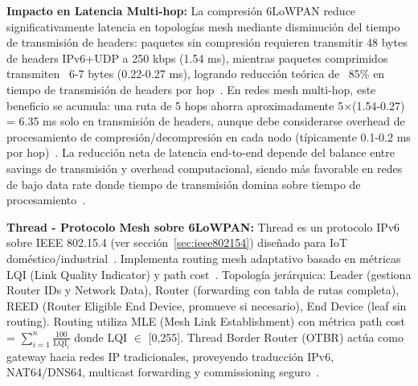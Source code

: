 \textbf{Impacto en Latencia Multi-hop:} La compresión 6LoWPAN reduce significativamente latencia en topologías mesh mediante disminución del tiempo de transmisión de headers: paquetes sin compresión requieren transmitir 48 bytes de headers IPv6+UDP a 250 kbps (1.54 ms), mientras paquetes comprimidos transmiten ~6-7 bytes (0.22-0.27 ms), logrando reducción teórica de ~85\% en tiempo de transmisión de headers por hop~\cite{shelby6LoWPANWirelessEmbedded2009,abood6LoWPANTechnicalFeatures2024}. En redes mesh multi-hop, este beneficio se acumula: una ruta de 5 hops ahorra aproximadamente 5$\times$(1.54-0.27) = 6.35 ms solo en transmisión de headers, aunque debe considerarse overhead de procesamiento de compresión/decompresión en cada nodo (típicamente 0.1-0.2 ms por hop)~\cite{vanderveldenEvaluation6LoWPANGeneric2023}. La reducción neta de latencia end-to-end depende del balance entre savings de transmisión y overhead computacional, siendo más favorable en redes de bajo data rate donde tiempo de transmisión domina sobre tiempo de procesamiento~\cite{vanderveldenEvaluation6LoWPANGeneric2023}.

\textbf{Thread - Protocolo Mesh sobre 6LoWPAN:} Thread es un protocolo IPv6 sobre IEEE 802.15.4 (ver sección~\ref{sec:ieee802154}) diseñado para IoT doméstico/industrial~\cite{abdulsalamOverviewRecentWireless2024}. Implementa routing mesh adaptativo basado en métricas LQI (Link Quality Indicator) y path cost~\cite{choudharyInternetThingsComprehensive2024}. Topología jerárquica: Leader (gestiona Router IDs y Network Data), Router (forwarding con tabla de rutas completa), REED (Router Eligible End Device, promueve si necesario), End Device (leaf sin routing). Routing utiliza MLE (Mesh Link Establishment) con métrica path cost = $\sum_{i=1}^{n} \frac{100}{\text{LQI}_i}$ donde LQI $\in$ [0,255]. Thread Border Router (OTBR) actúa como gateway hacia redes IP tradicionales, proveyendo traducción IPv6, NAT64/DNS64, multicast forwarding y commissioning seguro~\cite{choudharyInternetThingsComprehensive2024,openthread2024}.

